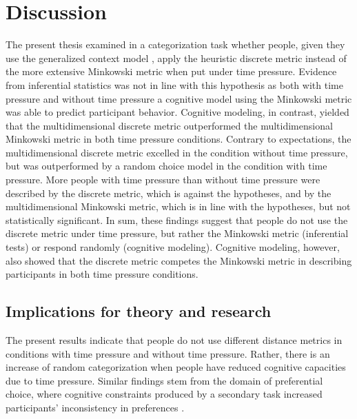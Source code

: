 \documentclass[a4paper,man,natbib]{apa6}
\begin{document}
\section{Discussion}
The present thesis examined in a categorization task whether people, given they use the generalized context model \citep{nosofsky1986attention}, apply the heuristic discrete metric instead of the more extensive Minkowski metric when put under time pressure. Evidence from inferential statistics was not in line with this hypothesis as both with time pressure and without time pressure a cognitive model using the Minkowski metric was able to predict participant behavior. Cognitive modeling, in contrast, yielded that the multidimensional discrete metric outperformed the multidimensional Minkowski metric in both time pressure conditions. Contrary to expectations, the multidimensional discrete metric excelled in the condition without time pressure, but was outperformed by a random choice model in the condition with time pressure. More people with time pressure than without time pressure were described by the discrete metric, which is against the hypotheses, and by the multidimensional Minkowski metric, which is in line with the hypotheses, but not statistically significant. In sum, these findings suggest that people do not use the discrete metric under time pressure, but rather the Minkowski metric (inferential tests) or respond randomly (cognitive modeling). Cognitive modeling, however, also showed that the discrete metric competes the Minkowski metric in describing participants in both time pressure conditions. 

\subsection{Implications for theory and research}
The present results indicate that people do not use different distance metrics in conditions with time pressure and without time pressure. Rather, there is an increase of random categorization when people have reduced cognitive capacities due to time pressure. Similar findings stem from the domain of preferential choice, where cognitive constraints produced by a secondary task increased participants' inconsistency in preferences \citep{olschewski2018taxing, burks2009cognitive}. 
\end{document}
